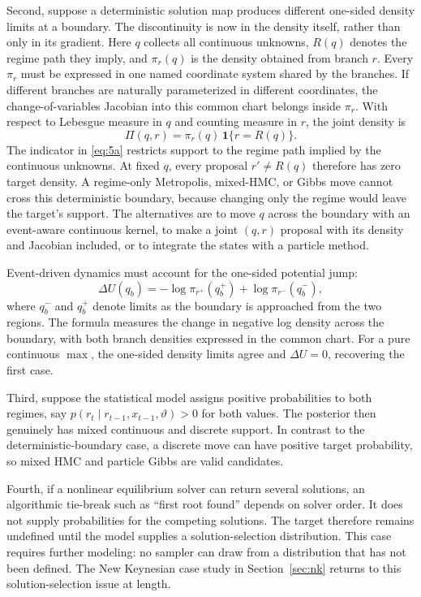 \documentclass[11pt]{article}
\begin{document}
Second, suppose a deterministic solution map produces different one-sided density limits at a boundary. The discontinuity is now in the density itself, rather than only in its gradient. Here \(q\) collects all continuous unknowns, \(R(q)\) denotes the regime path they imply, and \(\pi_r(q)\) is the density obtained from branch \(r\). Every \(\pi_r\) must be expressed in one named coordinate system shared by the branches. If different branches are naturally parameterized in different coordinates, the change-of-variables Jacobian into this common chart belongs inside \(\pi_r\). With respect to Lebesgue measure in \(q\) and counting measure in \(r\), the joint density is
\begin{equation}\label{eq:5a}
 \Pi(q,r)=\pi_r(q)\,\mathbf 1\{r=R(q)\}.
\end{equation}
The indicator in \eqref{eq:5a} restricts support to the regime path implied by the continuous unknowns. At fixed \(q\), every proposal \(r'\ne R(q)\) therefore has zero target density. A regime-only Metropolis, mixed-HMC, or Gibbs move cannot cross this deterministic boundary, because changing only the regime would leave the target's support. The alternatives are to move \(q\) across the boundary with an event-aware continuous kernel, to make a joint \((q,r)\) proposal with its density and Jacobian included, or to integrate the states with a particle method.

Event-driven dynamics must account for the one-sided potential jump:
\begin{equation}\label{eq:5b}
 \Delta U(q_b)=-\log \pi_{r^+}(q_b^+)+\log \pi_{r^-}(q_b^-),
\end{equation}
where \(q_b^-\) and \(q_b^+\) denote limits as the boundary is approached from the two regions. The formula measures the change in negative log density across the boundary, with both branch densities expressed in the common chart. For a pure continuous \(\max\), the one-sided density limits agree and \(\Delta U=0\), recovering the first case.

Third, suppose the statistical model assigns positive probabilities to both regimes, say \(p(r_t\mid r_{t-1},x_{t-1},\vartheta)>0\) for both values. The posterior then genuinely has mixed continuous and discrete support. In contrast to the deterministic-boundary case, a discrete move can have positive target probability, so mixed HMC and particle Gibbs are valid candidates.

Fourth, if a nonlinear equilibrium solver can return several solutions, an algorithmic tie-break such as ``first root found'' depends on solver order. It does not supply probabilities for the competing solutions. The target therefore remains undefined until the model supplies a solution-selection distribution. This case requires further modeling: no sampler can draw from a distribution that has not been defined. The New Keynesian case study in Section~\ref{sec:nk} returns to this solution-selection issue at length.
\end{document}
